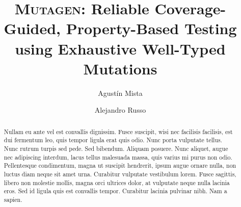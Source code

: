 \documentclass[acmsmall, anonymous]{acmart}
\newcommand{\mutagen}{\textsc{Mutagen}\xspace}
\begin{document}
\title[\mutagen]{\mutagen: Reliable Coverage-Guided, Property-Based Testing using
  Exhaustive Well-Typed Mutations}


\author{Agust\'in Mista}

\author{Alejandro Russo}





\begin{abstract}
  Nullam eu ante vel est convallis dignissim. Fusce suscipit, wisi nec facilisis
  facilisis, est dui fermentum leo, quis tempor ligula erat quis odio. Nunc
  porta vulputate tellus. Nunc rutrum turpis sed pede. Sed bibendum. Aliquam
  posuere. Nunc aliquet, augue nec adipiscing interdum, lacus tellus malesuada
  massa, quis varius mi purus non odio. Pellentesque condimentum, magna ut
  suscipit hendrerit, ipsum augue ornare nulla, non luctus diam neque sit amet
  urna. Curabitur vulputate vestibulum lorem. Fusce sagittis, libero non
  molestie mollis, magna orci ultrices dolor, at vulputate neque nulla lacinia
  eros. Sed id ligula quis est convallis tempor. Curabitur lacinia pulvinar
  nibh. Nam a sapien.
\end{abstract}


\begin{CCSXML}
\end{CCSXML}
\end{document}
